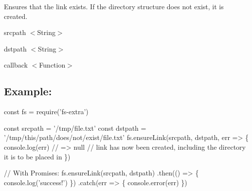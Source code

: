 Ensures that the link exists. If the directory structure does not exist, it is created.


\begin{DoxyItemize}
\item {\ttfamily srcpath} {\ttfamily $<$String$>$}
\item {\ttfamily dstpath} {\ttfamily $<$String$>$}
\item {\ttfamily callback} {\ttfamily $<$Function$>$}
\end{DoxyItemize}

\subsection*{Example\+:}


\begin{DoxyCode}
const fs = require('fs-extra')

const srcpath = '/tmp/file.txt'
const dstpath = '/tmp/this/path/does/not/exist/file.txt'
fs.ensureLink(srcpath, dstpath, err => \{
  console.log(err) // => null
  // link has now been created, including the directory it is to be placed in
\})

// With Promises:
fs.ensureLink(srcpath, dstpath)
.then(() => \{
  console.log('success!')
\})
.catch(err => \{
  console.error(err)
\})
\end{DoxyCode}
 